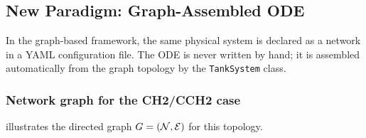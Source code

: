 \subsection{New Paradigm: Graph-Assembled ODE}
\label{sec:comparison:new}

In the graph-based framework, the same physical system is declared as a network
in a YAML configuration file.  The ODE is never written by hand; it is
assembled automatically from the graph topology by the \texttt{TankSystem}
class.

\subsubsection{Network graph for the CH2/CCH2 case}

 illustrates the directed graph
$G = (\mathcal{N}, \mathcal{E})$ for this topology.

